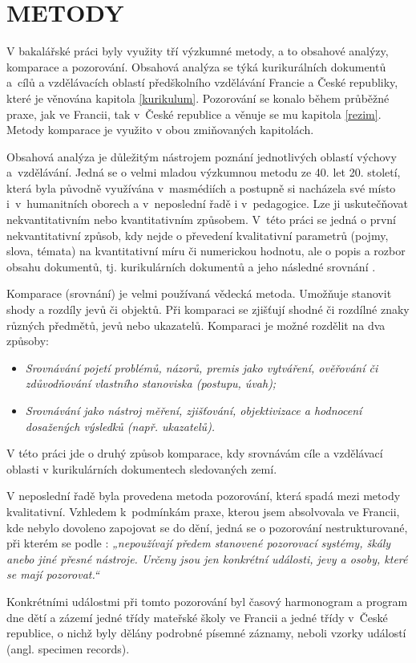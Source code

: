
\chapter{METODY}
\label{metody}

V bakalářské práci byly využity tří výzkumné metody, a to obsahové analýzy, komparace a pozorování. Obsahová analýza se týká kurikurálních dokumentů a cílů a vzdělávacích oblastí předškolního vzdělávání Francie a České republiky, které je věnována kapitola \ref{kurikulum}. Pozorování se konalo během průběžné praxe, jak ve Francii, tak v České republice a věnuje se mu kapitola \ref{rezim}. Metody komparace je využito v obou zmiňovaných kapitolách. 

Obsahová analýza je důležitým nástrojem poznání jednotlivých oblastí výchovy a vzdělávání. Jedná se o velmi mladou výzkumnou metodu ze 40. let 20. století, která byla původně využívána v masmédiích a postupně si nacházela své místo i v humanitních oborech a v neposlední řadě i v pedagogice. Lze ji uskutečňovat nekvantitativním nebo kvantitativním způsobem. V této práci se jedná o první nekvantitativní způsob, kdy nejde o převedení kvalitativní parametrů (pojmy, slova, témata) na kvantitativní míru či numerickou hodnotu, ale o popis a rozbor obsahu dokumentů, tj. kurikulárních dokumentů a jeho následné srovnání \citep{Gavora08}.

Komparace (srovnání) je velmi používaná vědecká metoda. Umožňuje stanovit shody a rozdíly jevů či objektů. Při komparaci se zjišťují shodné či rozdílné znaky různých předmětů, jevů nebo ukazatelů. 
Komparaci je možné rozdělit na dva způsoby:
\begin{itemize}
\item []\textit{Srovnávání pojetí problémů, názorů, premis jako vytváření, ověřování či zdůvodňování vlastního stanoviska (postupu, úvah);}
\item []\textit{Srovnávání jako nástroj měření, zjišťování, objektivizace a hodnocení dosažených výsledků (např. ukazatelů).} \citep[s.~19]{Siroky}
\end{itemize}
V této práci jde o druhý způsob komparace, kdy srovnávám cíle a vzdělávací oblasti v kurikulárních dokumentech sledovaných zemí.  

V neposlední řadě byla provedena metoda pozorování, která spadá mezi metody kvalitativní. Vzhledem k podmínkám praxe, kterou jsem absolvovala ve Francii, kde nebylo dovoleno zapojovat se do dění, jedná se o pozorování nestrukturované, při kterém se podle \citet[s.~17]{Gavora96}: \textit{„nepoužívají předem stanovené pozorovací systémy, škály anebo jiné přesné nástroje. Určeny jsou jen konkrétní události, jevy a osoby, které se mají pozorovat.“} 

Konkrétními událostmi při tomto pozorování byl časový harmonogram a program dne dětí a zázemí jedné třídy mateřské školy ve Francii a jedné třídy v České republice, o nichž byly dělány podrobné písemné záznamy, neboli vzorky událostí (angl. specimen records). 
